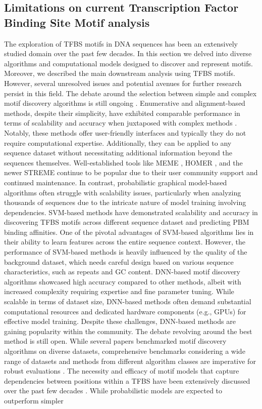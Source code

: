 \documentclass[a4paper, titlepage, openright]{book}
\begin{document}
\subsection{Limitations on current Transcription Factor Binding Site Motif analysis}
The exploration of TFBS motifs in DNA sequences has been an extensively studied domain over the past few decades. In this section we delved into diverse algorithms and computational models designed to discover and represent motifs. Moreover, we described the main downstream analysis using TFBS motifs. However, several unresolved issues and potential avenues for further research persist in this field. The debate around the selection between simple and complex motif discovery algorithms is still ongoing \citep{tognon2023survey}. Enumerative and alignment-based methods, despite their simplicity, have exhibited comparable performance in terms of scalability and accuracy when juxtaposed with complex methods \citep{weirauch2013evaluation}. Notably, these methods offer user-friendly interfaces and typically they do not require computational expertise. Additionally, they can be applied to any sequence dataset without necessitating additional information beyond the sequences themselves. Well-established tools like MEME \citep{bailey1994fitting,bailey1995value,bailey2006meme}, HOMER \citep{heinz2010simple}, and the newer STREME \citep{bailey2021streme} continue to be popular due to their user community support and continued maintenance. In contrast, probabilistic graphical model-based algorithms often struggle with scalability issues, particularly when analyzing thousands of sequences due to the intricate nature of model training involving dependencies. SVM-based methods have demonstrated scalability and accuracy in discovering TFBS motifs across different sequence dataset and predicting PBM binding affinities. One of the pivotal advantages of SVM-based algorithms lies in their ability to learn features across the entire sequence context. However, the performance of SVM-based methods is heavily influenced by the quality of the background dataset, which needs careful design based on various sequence characteristics, such as repeats and GC content. DNN-based motif discovery algorithms showcased high accuracy compared to other methods, albeit with increased complexity requiring expertise and fine parameter tuning. While scalable in terms of dataset size, DNN-based methods often demand substantial computational resources and dedicated hardware components (e.g., GPUs) for effective model training. Despite these challenges, DNN-based methods are gaining popularity within the community. The debate revolving around the best method is still open. While several papers benchmarked motif discovery algorithms on diverse datasets, comprehensive benchmarks considering a wide range of datasets and methods from different algorithm classes are imperative for robust evaluations \citep{tognon2023survey}. The necessity and efficacy of motif models that capture dependencies between positions within a TFBS have been extensively discussed over the past few decades \citep{weirauch2013evaluation,bulyk2002nucleotides,benos2002additivity, siggers2014protein}. While probabilistic models are expected to outperform simpler 
\end{document}
